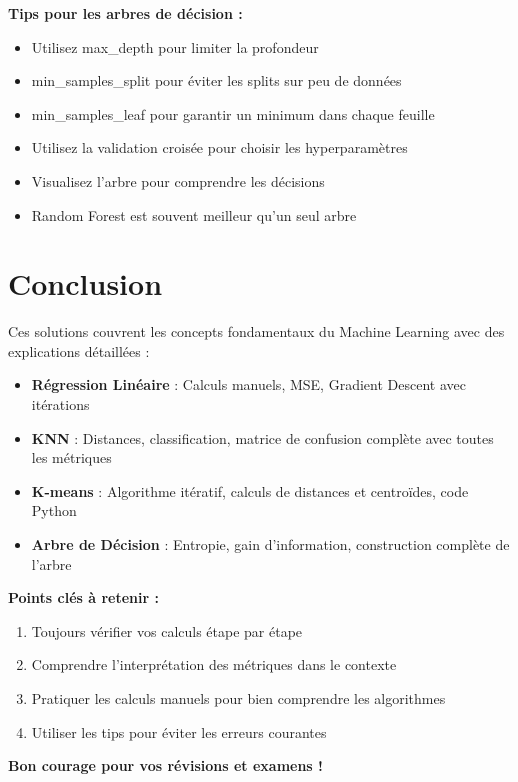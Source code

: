 \documentclass[11pt,a4paper]{article}
\begin{document}
\begin{tipbox}
\textbf{Tips pour les arbres de décision :}
\begin{itemize}
    \item Utilisez max\_depth pour limiter la profondeur
    \item min\_samples\_split pour éviter les splits sur peu de données
    \item min\_samples\_leaf pour garantir un minimum dans chaque feuille
    \item Utilisez la validation croisée pour choisir les hyperparamètres
    \item Visualisez l'arbre pour comprendre les décisions
    \item Random Forest est souvent meilleur qu'un seul arbre
\end{itemize}
\end{tipbox}

\newpage


\section{Conclusion}

Ces solutions couvrent les concepts fondamentaux du Machine Learning avec des explications détaillées :

\begin{itemize}
    \item \textbf{Régression Linéaire} : Calculs manuels, MSE, Gradient Descent avec itérations
    \item \textbf{KNN} : Distances, classification, matrice de confusion complète avec toutes les métriques
    \item \textbf{K-means} : Algorithme itératif, calculs de distances et centroïdes, code Python
    \item \textbf{Arbre de Décision} : Entropie, gain d'information, construction complète de l'arbre
\end{itemize}

\textbf{Points clés à retenir :}
\begin{enumerate}
    \item Toujours vérifier vos calculs étape par étape
    \item Comprendre l'interprétation des métriques dans le contexte
    \item Pratiquer les calculs manuels pour bien comprendre les algorithmes
    \item Utiliser les tips pour éviter les erreurs courantes
\end{enumerate}

\textbf{Bon courage pour vos révisions et examens !}
\end{document}
